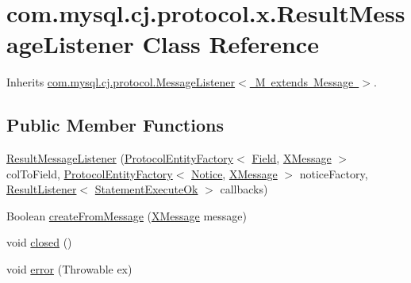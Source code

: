 \hypertarget{classcom_1_1mysql_1_1cj_1_1protocol_1_1x_1_1_result_message_listener}{}\section{com.\+mysql.\+cj.\+protocol.\+x.\+Result\+Message\+Listener Class Reference}
\label{classcom_1_1mysql_1_1cj_1_1protocol_1_1x_1_1_result_message_listener}


Inherits \mbox{\hyperlink{interfacecom_1_1mysql_1_1cj_1_1protocol_1_1_message_listener}{com.\+mysql.\+cj.\+protocol.\+Message\+Listener$<$ M extends Message $>$}}.

\subsection*{Public Member Functions}
\begin{DoxyCompactItemize}
\item 
\mbox{\hyperlink{classcom_1_1mysql_1_1cj_1_1protocol_1_1x_1_1_result_message_listener_a11f2adec18c2182473f77f004b237984}{Result\+Message\+Listener}} (\mbox{\hyperlink{interfacecom_1_1mysql_1_1cj_1_1protocol_1_1_protocol_entity_factory}{Protocol\+Entity\+Factory}}$<$ \mbox{\hyperlink{classcom_1_1mysql_1_1cj_1_1result_1_1_field}{Field}}, \mbox{\hyperlink{classcom_1_1mysql_1_1cj_1_1protocol_1_1x_1_1_x_message}{X\+Message}} $>$ col\+To\+Field, \mbox{\hyperlink{interfacecom_1_1mysql_1_1cj_1_1protocol_1_1_protocol_entity_factory}{Protocol\+Entity\+Factory}}$<$ \mbox{\hyperlink{classcom_1_1mysql_1_1cj_1_1protocol_1_1x_1_1_notice}{Notice}}, \mbox{\hyperlink{classcom_1_1mysql_1_1cj_1_1protocol_1_1x_1_1_x_message}{X\+Message}} $>$ notice\+Factory, \mbox{\hyperlink{interfacecom_1_1mysql_1_1cj_1_1protocol_1_1_result_listener}{Result\+Listener}}$<$ \mbox{\hyperlink{classcom_1_1mysql_1_1cj_1_1protocol_1_1x_1_1_statement_execute_ok}{Statement\+Execute\+Ok}} $>$ callbacks)
\item 
Boolean \mbox{\hyperlink{classcom_1_1mysql_1_1cj_1_1protocol_1_1x_1_1_result_message_listener_a08fc8c82309b101b59b186522c051a13}{create\+From\+Message}} (\mbox{\hyperlink{classcom_1_1mysql_1_1cj_1_1protocol_1_1x_1_1_x_message}{X\+Message}} message)
\item 
void \mbox{\hyperlink{classcom_1_1mysql_1_1cj_1_1protocol_1_1x_1_1_result_message_listener_a72527b705b89b553d393412f88615f86}{closed}} ()
\item 
void \mbox{\hyperlink{classcom_1_1mysql_1_1cj_1_1protocol_1_1x_1_1_result_message_listener_ad8c3856e573b2bcad94f5b914e5f9c82}{error}} (Throwable ex)
\end{DoxyCompactItemize}


